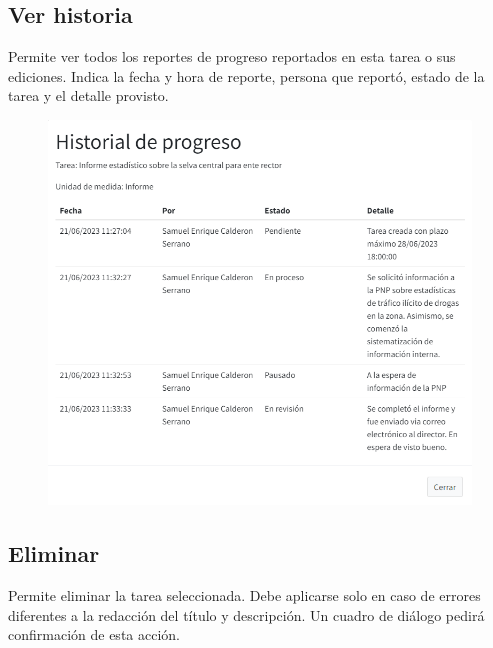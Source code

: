 \documentclass[
  letterpaper,
  DIV=11,
  numbers=noendperiod]{scrreprt}
\begin{document}
\hypertarget{ver-historia}{%
\subsection{Ver historia}\label{ver-historia}}

Permite ver todos los reportes de progreso reportados en esta tarea o
sus ediciones. Indica la fecha y hora de reporte, persona que reportó,
estado de la tarea y el detalle provisto.

\begin{figure}

{\centering \includegraphics[width=6.25in,height=\textheight]{./img/manual-user/task-history.png}

}

\end{figure}

\hypertarget{eliminar}{%
\subsection{Eliminar}\label{eliminar}}

Permite eliminar la tarea seleccionada. Debe aplicarse solo en caso de
errores diferentes a la redacción del título y descripción. Un cuadro de
diálogo pedirá confirmación de esta acción.
\end{document}
